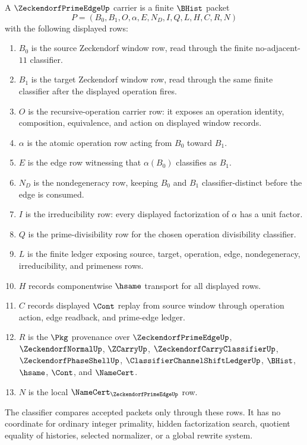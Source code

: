 \begin{definition}
\label{def:zeckendorf-prime-edge-carrier}
A $\ZeckendorfPrimeEdgeUp$ carrier is a finite $\BHist$ packet
$$
P=(B_0,B_1,O,\alpha,E,N_D,I,Q,L,H,C,R,N)
$$
with the following displayed rows:
\begin{enumerate}
\item $B_0$ is the source Zeckendorf window row, read through the finite no-adjacent-$11$ classifier.
\item $B_1$ is the target Zeckendorf window row, read through the same finite classifier after the displayed operation fires.
\item $O$ is the recursive-operation carrier row: it exposes an operation identity, composition, equivalence, and action on displayed window records.
\item $\alpha$ is the atomic operation row acting from $B_0$ toward $B_1$.
\item $E$ is the edge row witnessing that $\alpha(B_0)$ classifies as $B_1$.
\item $N_D$ is the nondegeneracy row, keeping $B_0$ and $B_1$ classifier-distinct before the edge is consumed.
\item $I$ is the irreducibility row: every displayed factorization of $\alpha$ has a unit factor.
\item $Q$ is the prime-divisibility row for the chosen operation divisibility classifier.
\item $L$ is the finite ledger exposing source, target, operation, edge, nondegeneracy, irreducibility, and primeness rows.
\item $H$ records componentwise $\hsame$ transport for all displayed rows.
\item $C$ records displayed $\Cont$ replay from source window through operation action, edge readback, and prime-edge ledger.
\item $R$ is the $\Pkg$ provenance over $\ZeckendorfPrimeEdgeUp$, $\ZeckendorfNormalUp$, $\ZCarryUp$, $\ZeckendorfCarryClassifierUp$, $\ZeckendorfPhaseShellUp$, $\ClassifierChannelShiftLedgerUp$, $\BHist$, $\hsame$, $\Cont$, and $\NameCert$.
\item $N$ is the local $\NameCert_{\ZeckendorfPrimeEdgeUp}$ row.
\end{enumerate}
The classifier compares accepted packets only through these rows. It has no coordinate for ordinary integer primality, hidden factorization search, quotient equality of histories, selected normalizer, or a global rewrite system.
\end{definition}

